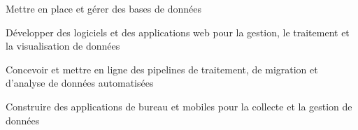 

\begin{cvskills}

  \begin{minipage}[t]{0.45\textwidth}
    \cvskill
      {Mettre en place et gérer des bases de données}
  \end{minipage}\hfill
  \begin{minipage}[t]{0.45\textwidth}
    \cvskill
      {Développer des logiciels et des applications web pour la gestion, le traitement et la visualisation de données}
  \end{minipage}

  \begin{minipage}[t]{0.45\textwidth}
    \cvskill
      {Concevoir et mettre en ligne des pipelines de traitement, de migration et d'analyse de données automatisées}
  \end{minipage}\hfill
  \begin{minipage}[t]{0.45\textwidth}
    \cvskill
      {Construire des applications de bureau et mobiles pour la collecte et la gestion de données}
  \end{minipage}

\end{cvskills}